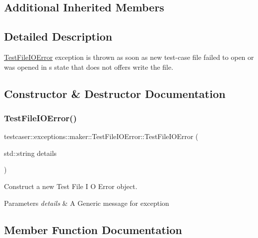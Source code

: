 \subsection*{Additional Inherited Members}


\subsection{Detailed Description}
\mbox{\hyperlink{classtestcaser_1_1exceptions_1_1maker_1_1TestFileIOError}{Test\+File\+I\+O\+Error}} exception is thrown as soon as new test-\/case file failed to open or was opened in s state that does not offers write the file. 



\subsection{Constructor \& Destructor Documentation}
\mbox{\label{classtestcaser_1_1exceptions_1_1maker_1_1TestFileIOError_a2168ea54454727b86b6e00e5cd8103e0}} 
\subsubsection{\texorpdfstring{TestFileIOError()}{TestFileIOError()}}
{\footnotesize\ttfamily testcaser\+::exceptions\+::maker\+::\+Test\+File\+I\+O\+Error\+::\+Test\+File\+I\+O\+Error (\begin{DoxyParamCaption}\item[{std\+::string}]{details }\end{DoxyParamCaption})\hspace{0.3cm}{\ttfamily [inline]}}



Construct a new Test File I O Error object. 


\begin{DoxyParams}{Parameters}
{\em details} & A Generic message for exception \\
\hline
\end{DoxyParams}


\subsection{Member Function Documentation}
\mbox{\label{classtestcaser_1_1exceptions_1_1maker_1_1TestFileIOError_ab83e748d26f860c9b045535447a383c5}} 
